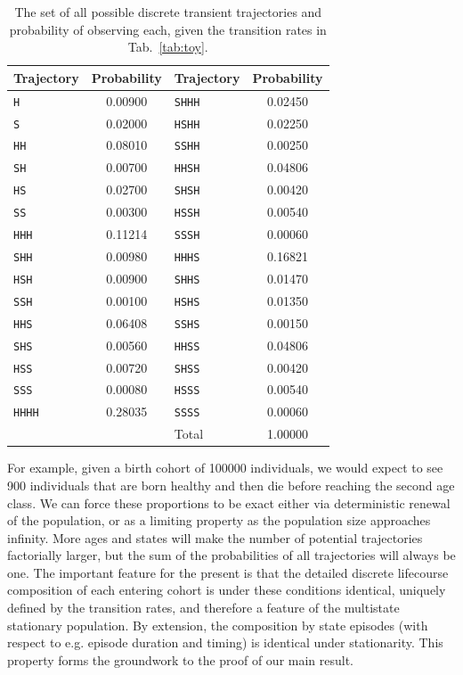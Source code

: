 \documentclass[12pt,oneside,a4paper]{article}
\theoremstyle{definition}
\newcommand{\vb}[1]{\texttt{#1}}
\begin{document}
\begin{table}[ht]
\centering
 \caption{The set of all possible discrete transient trajectories and probability of observing each, given the transition rates in Tab.~\ref{tab:toy}. }
 \label{tab:traj}
\begin{tabular}{lc|lc}
  \hline
Trajectory & Probability & Trajectory & Probability \\ 
  \hline
\vb{H} & 0.00900 & \vb{SHHH} & 0.02450 \\ 
  \vb{S} & 0.02000 & \vb{HSHH} & 0.02250 \\ 
  \vb{HH} & 0.08010 & \vb{SSHH} & 0.00250 \\ 
  \vb{SH} & 0.00700 & \vb{HHSH} & 0.04806 \\ 
  \vb{HS} & 0.02700 & \vb{SHSH} & 0.00420 \\ 
  \vb{SS} & 0.00300 & \vb{HSSH} & 0.00540 \\ 
  \vb{HHH} & 0.11214 & \vb{SSSH} & 0.00060 \\ 
  \vb{SHH} & 0.00980 & \vb{HHHS} & 0.16821 \\ 
  \vb{HSH} & 0.00900 & \vb{SHHS} & 0.01470 \\ 
  \vb{SSH} & 0.00100 & \vb{HSHS} & 0.01350 \\ 
  \vb{HHS} & 0.06408 & \vb{SSHS} & 0.00150 \\ 
  \vb{SHS} & 0.00560 & \vb{HHSS} & 0.04806 \\ 
  \vb{HSS} & 0.00720 & \vb{SHSS} & 0.00420 \\ 
  \vb{SSS} & 0.00080 & \vb{HSSS} & 0.00540 \\ 
  \vb{HHHH} & 0.28035 & \vb{SSSS} & 0.00060 \\ 
  \hline
  &&Total& 1.00000\\
   \hline
\end{tabular}
\end{table}

For example, given a birth cohort of 100000 individuals, we would expect to see 900 individuals that are born healthy and then die before reaching the second age class. We can force these proportions to be exact either via deterministic renewal of the population, or as a limiting property as the population size approaches infinity. More ages and states will make the number of potential trajectories factorially larger, but the sum of the probabilities of all trajectories will always be one. The important feature for the present is that the detailed discrete lifecourse composition of each entering cohort is under these conditions identical, uniquely defined by the transition rates, and therefore a feature of the multistate stationary population. By extension, the composition by state episodes (with respect to e.g. episode duration and timing) is identical under stationarity. This property forms the groundwork to the proof of our main result.
\end{document}
